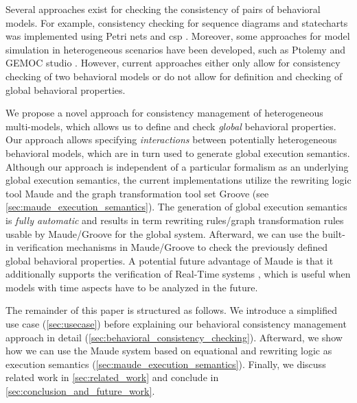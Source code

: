 \documentclass{jot}
\begin{document}
Several approaches exist for checking the consistency of pairs of behavioral models.
For example, consistency checking for sequence diagrams and statecharts was implemented using Petri nets \cite{yaoConsistencyCheckingUML2006} and \gls*{csp} \cite{kusterExplicitBehavioralConsistency2003}.
Moreover, some approaches for model simulation in heterogeneous scenarios have been developed, such as Ptolemy \cite{ekerTamingHeterogeneityPtolemy2003, leeDisciplinedHeterogeneousModeling2010} and GEMOC studio \cite{deantoniModelingBehavioralSemantics2016, varalarsenBCoolBehavioralCoordination2016}.
However, current approaches either only allow for consistency checking of two behavioral models or do not allow for definition and checking of global behavioral properties.

We propose a novel approach for consistency management of heterogeneous multi-models, which allows us to define and check \emph{global} behavioral properties.
Our approach allows specifying \emph{interactions} between potentially heterogeneous behavioral models, which are in turn used to generate global execution semantics.
Although our approach is independent of a particular formalism as an underlying global execution semantics, the current implementations utilize the rewriting logic tool Maude and the graph transformation tool set Groove (see \autoref{sec:maude_execution_semantics}).
The generation of global execution semantics is \textit{fully automatic} and results in term rewriting rules/graph transformation rules usable by Maude/Groove for the global system.
Afterward, we can use the built-in verification mechanisms in Maude/Groove to check the previously defined global behavioral properties.
A potential future advantage of Maude is that it additionally supports the verification of Real-Time systems \cite{olveczkySemanticsPragmaticsRealTime2007, duranVerifyingTimedBPMN2017}, which is useful when models with time aspects have to be analyzed in the future.

The remainder of this paper is structured as follows.
We introduce a simplified use case (\autoref{sec:usecase}) before explaining our behavioral consistency management approach in detail (\autoref{sec:behavioral_consistency_checking}).
Afterward, we show how we can use the Maude system based on equational and rewriting logic as execution semantics (\autoref{sec:maude_execution_semantics}).
Finally, we discuss related work in \autoref{sec:related_work} and conclude in \autoref{sec:conclusion_and_future_work}.
\end{document}
